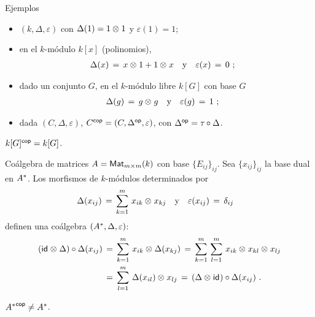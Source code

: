 \begin{frame}{Ejemplos}
	\begin{itemize}
		\item $(k,\Delta,\varepsilon)$ con $\Delta(1)=1\tensor 1$ y
			$\varepsilon(1)=1$;
		\item en el $k$-m\'{o}dulo $k[x]$ (polinomios),
			\begin{align*}
				\Delta(x) \,=\,x\tensor 1 + 1\tensor x
					& \quad\text{y}\quad
				\varepsilon(x)\,=\,0
				\text{ ;}
			\end{align*}
		\item dado un conjunto $G$, en el $k$-m\'{o}dulo libre
			$k[G]$ con base $G$
			\begin{align*}
				\Delta(g) \,=\, g\tensor g
					& \quad\text{y}\quad
				\varepsilon(g)\,=\,1
				\text{ ;}
			\end{align*}
		\item dada $(C,\Delta,\varepsilon)$,
			$C^\copp=(C,\Delta^\opp,\varepsilon)$, con
			$\Delta^\opp=\swap\circ\Delta$.
	\end{itemize}
	\begin{obsCoconmutativa}\label{obs:coconmutativa}
		$k[G]^\copp=k[G]$.
	\end{obsCoconmutativa}
\end{frame}

\begin{frame}{Co\'{a}lgebra de matrices}
	$A=\MM[m\times m](k)$ con base $\{E_{ij}\}_{ij}$. Sea $\{x_{ij}\}_{ij}$
	la base dual en $\dual A$. Los morfismos de $k$-m\'{o}dulos
	determinados por
	\begin{align*}
		\Delta(x_{ij}) \,=\,\sum_{k=1}^{m}\,x_{ik}\tensor x_{kj}
			& \quad\text{y}\quad
		\varepsilon(x_{ij}) \,=\,\delta_{ij}
	\end{align*}
	definen una co\'{a}lgebra $(\dual A,\Delta,\varepsilon)$:
	\begin{align*}
		(\id\tensor\Delta)\circ\Delta(x_{ij}) & \,=\,
			\sum_{k=1}^{m}\,x_{ik}\tensor\Delta(x_{kj}) \,=\,
			\sum_{k=1}^{m}\,\sum_{l=1}^{m}\,
				x_{ik}\tensor x_{kl}\tensor x_{lj} \\
		& \,=\, \sum_{l=1}^{m}\,\Delta(x_{il})\tensor x_{lj} \,=\,
			(\Delta\tensor\id)\circ\Delta(x_{ij})
		\text{ .}
	\end{align*}
	\begin{obsCoconmutativa}\label{obs:nococonmutativa}
		${\dual A}^\copp\not=\dual A$.
	\end{obsCoconmutativa}
\end{frame}

